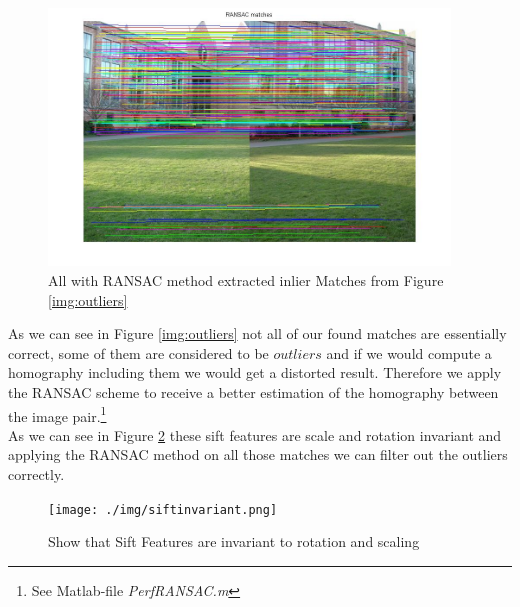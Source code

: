 \documentclass[subfigure,epsfig,fleqn,float,numbers=noenddot]{scrartcl}
\begin{document}
	\begin{figure}[H]
		\centering
		\includegraphics[width=0.95\textwidth]{./img/ransacMatches.jpg}
		\caption{All with RANSAC method extracted inlier Matches from Figure \ref{img:outliers}}
		\label{img:inliers}
	\end{figure}
As we can see in Figure \ref{img:outliers} not all of our found matches are essentially correct, some of them are considered to be $outliers$ and if we would compute a homography including them we would get a distorted result. Therefore we apply the RANSAC scheme to receive a better estimation of the homography between the image pair.\footnote{See Matlab-file \emph{PerfRANSAC.m} } \\
As we can see in Figure \ref{img:invariant} these sift features are scale and rotation invariant and applying the RANSAC method on all those matches we can filter out the outliers correctly.
	\begin{figure}[H]
		\centering
		\texttt{[image: ./img/siftinvariant.png]}
		\caption{Show that Sift Features are invariant to rotation and scaling}
		\label{img:invariant}
	\end{figure}
	
\end{document}
